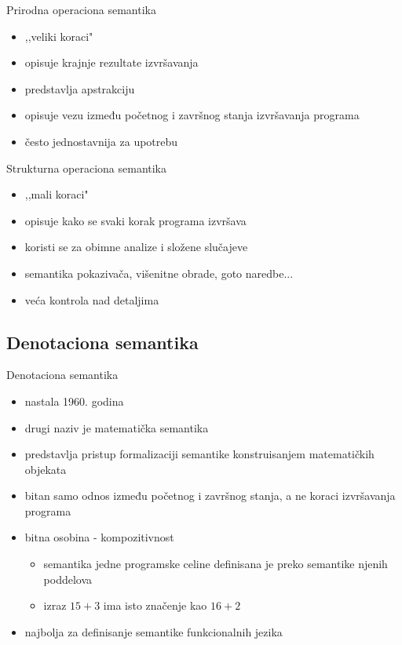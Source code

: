 \documentclass{beamer}
\begin{document}
\begin{frame}{Prirodna operaciona semantika}
	\begin{itemize}
 	\item ,,veliki koraci"
 	\item {\color{magenta} opisuje krajnje rezultate izvršavanja}
 	\item predstavlja apstrakciju
 	\item opisuje vezu između početnog i završnog stanja izvršavanja programa
 	\item često jednostavnija za upotrebu
 	\end{itemize}
\end{frame}

\begin{frame}{Strukturna operaciona semantika}
\begin{itemize}
	\item ,,mali koraci"
	\item  {\color{magenta} opisuje kako se svaki korak programa izvršava}
	\item koristi se za obimne analize i složene slučajeve
	\item semantika pokazivača, višenitne obrade, goto naredbe...
	\item veća kontrola nad detaljima
	\end{itemize}
\end{frame}
\subsection{Denotaciona semantika}
\begin{frame}{Denotaciona semantika}
  \begin{itemize}
  \item nastala 1960. godina
  \item drugi naziv je matematička semantika
  \item {\color{magenta} predstavlja pristup formalizaciji semantike konstruisanjem matematičkih objekata }
  \item bitan samo odnos između početnog i završnog stanja, a ne koraci izvršavanja programa
   \item bitna osobina -{\color{magenta} kompozitivnost }
   \begin{itemize}
   \item semantika jedne programske celine definisana je preko semantike njenih poddelova
   \item izraz $15 + 3$ ima isto značenje kao $16 + 2$
   \end{itemize}
   \item najbolja za definisanje semantike funkcionalnih jezika
   \end{itemize}
\end{frame}
\end{document}
